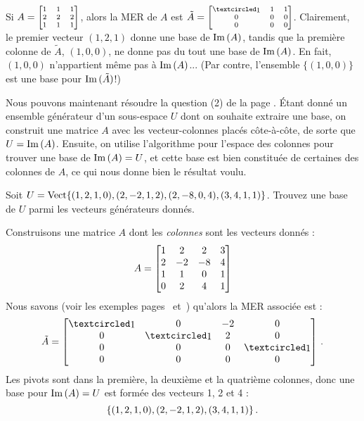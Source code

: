 
\begin{myexample}
Si $A = \scriptsize\mat{1&1&1\\2&2&2\\1&1&1}$, alors la MER de $A$ est  $\tilde A = \scriptsize\mat{\pivot&1&1\\0&0&0\\0&0&0}$.  Clairement, le premier vecteur $(1,2,1)$ donne une base de $\im(A)$, tandis que la première colonne de $\tilde A$, 
$(1,0,0)$, ne donne pas du tout une base de $\im(A)$. En fait, $(1,0,0)$ n'appartient même pas \`a $\im(A)$... (Par contre, l'ensemble $\{ (1,0,0)\}$ est une base pour $\im(\tilde A)$!)
\end{myexample}

  


Nous pouvons maintenant résoudre la question (2) de la page \pageref{FindingBases}. Étant donné un ensemble g\'en\'erateur d'un sous-espace $U$ dont on souhaite extraire une base, on construit une matrice $A$ avec les vecteur-colonnes placés côte-à-côte, de sorte que $U=\im(A)$. Ensuite, on utilise l'algorithme pour l'espace des colonnes pour trouver une base de $\im(A)=U$, et cette base est bien constituée de certaines des colonnes de $A$, ce qui nous donne bien le résultat voulu.

\begin{myprob}
Soit $U=\sp{(1, 2, 1, 0), (2, -2, 1, 2), (2, -8, 0, 4), (3, 4, 1, 1)}$. Trouvez une base de $U$ parmi les vecteurs g\'en\'erateurs donnés.

\begin{mysol} Construisons une matrice $A$ dont les {\it colonnes} sont les vecteurs donnés :
$$A=\mat{
1&2&2&3\\2&-2&-8&4\\1&1&0&1\\0&2&4&1}$$
Nous savons (voir les exemples pages~\pageref{rowspace1} et~\pageref{colspaceexample}) qu'alors la MER associée est :
$$\tilde A= \mat{\pivot & 0 & -2 & 0\\ 0 & \pivot & 2 & 0\\ 0 & 0 & 0 & \pivot\\ 0 & 0 & 0 & 0}\,.$$ Les pivots sont dans la premi\`ere, la deuxi\`eme et la quatri\`eme colonnes, donc une base pour $\im(A)=U$ est formée des vecteurs 1, 2 et 4 :
$$\set{(1, 2, 1, 0), (2, -2, 1, 2),  (3, 4, 1, 1)}\,.$$
\end{mysol}
\end{myprob}

